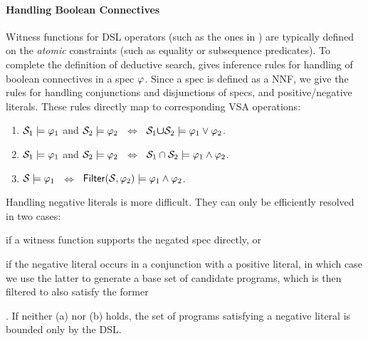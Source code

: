 \paragraph{Handling Boolean Connectives}
Witness functions for DSL operators (such as the ones in ) are typically defined on the
\emph{atomic} constraints (such as equality or subsequence predicates).
To complete the definition of deductive search,  gives inference rules for handling
of boolean connectives in a spec $\varphi$.
Since a spec is defined as a NNF, we give the rules for handling conjunctions and disjunctions of specs, and
positive/negative literals.
These rules directly map to corresponding VSA operations:

\begin{theorem} \leavevmode
    \begin{enumerate}[nosep, label=(\arabic*)]
        \item $\mathcal{S}_1 \models \varphi_1$ and $\mathcal{S}_2 \models \varphi_2$ $\ \Longleftrightarrow\ $ $\mathcal{S}_1 \bm{\mathsf{\cup}} \mathcal{S}_2 \models \varphi_1 \vee \varphi_2$.
        \item $\mathcal{S}_1 \models \varphi_1$ and $\mathcal{S}_2 \models \varphi_2$ $\ \Longleftrightarrow\ $ $\mathcal{S}_1 \cap \mathcal{S}_2 \models \varphi_1 \wedge \varphi_2$.
        \item $\mathcal{S} \models \varphi_1$ $\ \Longleftrightarrow\ $ $\mathsf{Filter}(\mathcal{S}, \varphi_2) \models \varphi_1 \wedge \varphi_2$.
    \end{enumerate}
    \label{thm:connectives:vsa}
\end{theorem}

Handling negative literals is more difficult.
They can only be efficiently resolved in two cases:
\begin{enumerate*}[label=(\alph*)]
    \item if a witness function supports the negated spec directly, or
    \item if the negative literal occurs in a conjunction with a positive literal, in which case we use the latter to
        generate a base set of candidate programs, which is then filtered to also satisfy the former
\end{enumerate*}.
If neither (a) nor (b) holds, the set of programs satisfying a negative literal is bounded only by the DSL.


